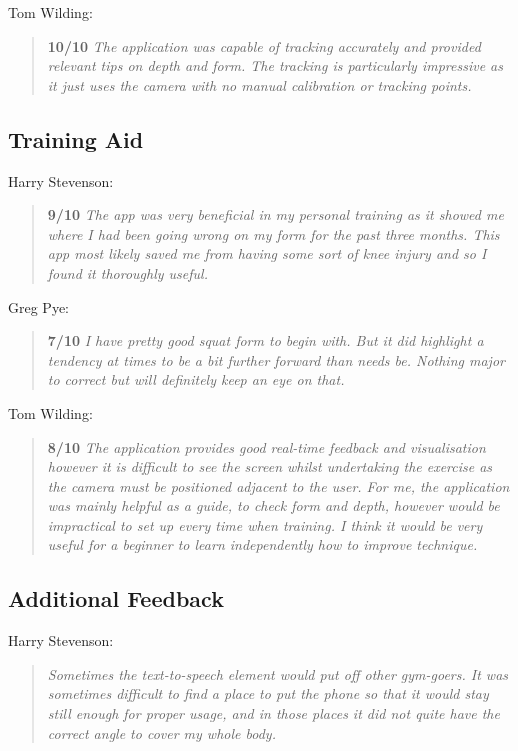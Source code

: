 Tom Wilding:
\begin{quote}
\textbf{10/10} \emph{The application was capable of tracking accurately and provided relevant tips on depth and form. The tracking is particularly impressive as it just uses the camera with no manual calibration or tracking points.}
\end{quote}

\subsection{Training Aid}

Harry Stevenson:
\begin{quote}
\textbf{9/10} \emph{The app was very beneficial in my personal training as it showed me where I had been going wrong on my form for the past three months. This app most likely saved me from having some sort of knee injury and so I found it thoroughly useful.}
\end{quote}

Greg Pye:
\begin{quote}
\textbf{7/10} \emph{I have pretty good squat form to begin with. But it did highlight a tendency at times to be a bit further forward than needs be. Nothing major to correct but will definitely keep an eye on that.}
\end{quote}

Tom Wilding:
\begin{quote}
\textbf{8/10} \emph{The application provides good real-time feedback and visualisation however it is difficult to see the screen whilst undertaking the exercise as the camera must be positioned adjacent to the user. For me, the application was mainly helpful as a guide, to check form and depth, however would be impractical to set up every time when training. I think it would be very useful for a beginner to learn independently how to improve technique.}
\end{quote}

\subsection{Additional Feedback}

Harry Stevenson:
\begin{quote}
\emph{Sometimes the text-to-speech element would put off other gym-goers. It was sometimes difficult to find a place to put the phone so that it would stay still enough for proper usage, and in those places it did not quite have the correct angle to cover my whole body.}
\end{quote}

